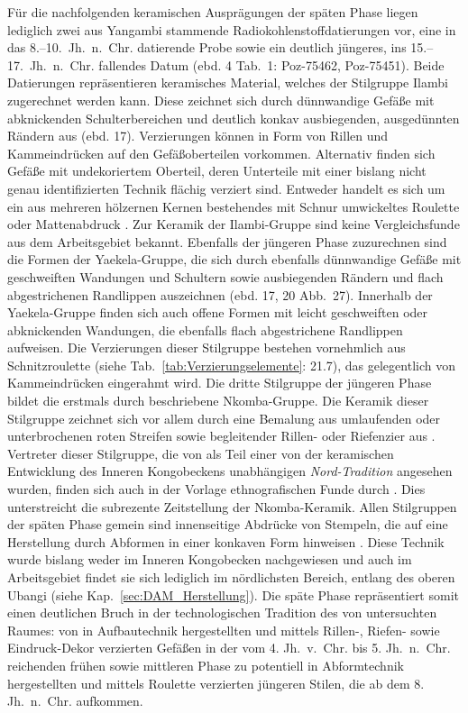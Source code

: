 Für die nachfolgenden keramischen Ausprägungen der späten Phase liegen lediglich zwei aus Yangambi stammende Radiokohlenstoffdatierungen vor, eine in das 8.--10.~Jh.~n.~Chr. datierende Probe sowie ein deutlich jüngeres, ins 15.--17.~Jh.~n.~Chr. fallendes Datum (ebd. 4 Tab.~1: Poz-75462, Poz-75451). Beide Datierungen repräsentieren keramisches Material, welches der Stilgruppe Ilambi zugerechnet werden kann. Diese zeichnet sich durch dünnwandige Gefäße mit abknickenden Schulterbereichen und deutlich konkav ausbiegenden, ausgedünnten Rändern aus (ebd. 17). Verzierungen können in Form von Rillen und Kammeindrücken auf den Gefäßoberteilen vorkommen. Alternativ finden sich Gefäße mit undekoriertem Oberteil, deren Unterteile mit einer bislang nicht genau identifizierten Technik flächig verziert sind. Entweder handelt es sich um ein aus mehreren hölzernen Kernen bestehendes mit Schnur umwickeltes Roulette \parencite[101 Abb.~1.29]{LivingstoneSmith.2010b} oder Mattenabdruck \parencite[17, 19 Abb.~26]{LivingstoneSmith.2017}. Zur Keramik der Ilambi-Gruppe sind keine Vergleichsfunde aus dem Arbeitsgebiet bekannt. Ebenfalls der jüngeren Phase zuzurechnen sind die Formen der Yaekela-Gruppe, die sich durch ebenfalls dünnwandige Gefäße mit geschweiften Wandungen und Schultern sowie ausbiegenden Rändern und flach abgestrichenen Randlippen auszeichnen (ebd. 17, 20 Abb.~27). Innerhalb der Yaekela-Gruppe finden sich auch offene Formen mit leicht geschweiften oder abknickenden Wandungen, die ebenfalls flach abgestrichene Randlippen aufweisen. Die Verzierungen dieser Stilgruppe bestehen vornehmlich aus Schnitzroulette (siehe Tab.~\ref{tab:Verzierungselemente}: 21.7), das gelegentlich von Kammeindrücken eingerahmt wird. Die dritte Stilgruppe der jüngeren Phase bildet die erstmals durch \textcite[207--210, 536 Taf.~102.2--4, 6--16]{Wotzka.1995} beschriebene Nkomba-Gruppe. Die Keramik dieser Stilgruppe zeichnet sich vor allem durch eine Bemalung aus umlaufenden oder unterbrochenen roten Streifen sowie begleitender Rillen- oder Riefenzier aus \parencite[20 Abb.~28]{LivingstoneSmith.2017}. Vertreter dieser Stilgruppe, die von \textcite[223f.]{Wotzka.1995} als Teil einer von der keramischen Entwicklung des Inneren Kongobeckens unabhängigen \textit{Nord-Tradition} angesehen wurden, finden sich auch in der Vorlage ethnografischen Funde durch \textcite[152--154, 157--159, Taf.~13.189--191]{Coart.1907}. Dies unterstreicht die subrezente Zeitstellung der Nkomba-Keramik. Allen Stilgruppen der späten Phase gemein sind innenseitige Abdrücke von Stempeln, die auf eine Herstellung durch Abformen in einer konkaven Form hinweisen \parencite[17]{LivingstoneSmith.2017}. Diese Technik wurde bislang weder im Inneren Kongobecken nachgewiesen und auch im Arbeitsgebiet findet sie sich lediglich im nördlichsten Bereich, entlang des oberen Ubangi (siehe Kap.~\ref{sec:DAM_Herstellung}). Die späte Phase repräsentiert somit einen deutlichen Bruch in der technologischen Tradition des von \textcite{LivingstoneSmith.2017} untersuchten Raumes: von in Aufbautechnik hergestellten und mittels Rillen-, Riefen- sowie Eindruck-Dekor verzierten Gefäßen in der vom 4. Jh.~v.~Chr. bis 5. Jh.~n.~Chr. reichenden frühen sowie mittleren Phase zu potentiell in Abformtechnik hergestellten und mittels Roulette verzierten jüngeren Stilen, die ab dem 8. Jh.~n.~Chr. aufkommen.


